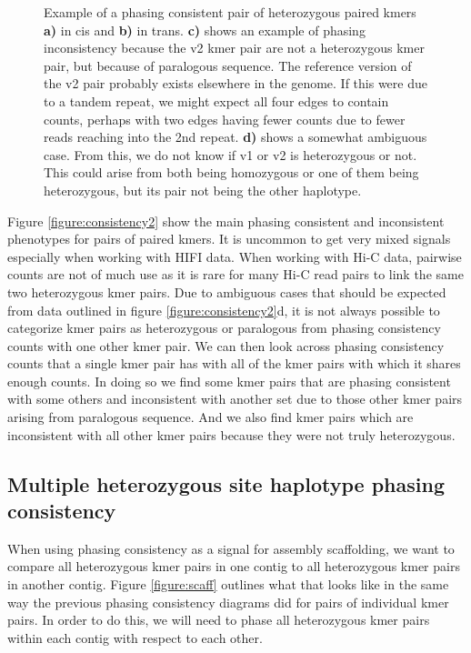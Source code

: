 \begin{figure}[htbp!]
{\begin{tikzpicture}[scale=1]
\end{tikzpicture}\label{fig:d}
}

\par{
Example of a phasing consistent pair of heterozygous paired kmers \textbf{a)} in cis and \textbf{b)} in trans. \textbf{c)} shows an example of phasing inconsistency because the v2 kmer pair are not a heterozygous kmer pair, but because of paralogous sequence. The reference version of the v2 pair probably exists elsewhere in the genome. If this were due to a tandem repeat, we might expect all four edges to contain counts, perhaps with two edges having fewer counts due to fewer reads reaching into the 2nd repeat. \textbf{d)} shows a somewhat ambiguous case. From this, we do not know if v1 or v2 is heterozygous or not. This could arise from both being homozygous or one of them being heterozygous, but its pair not being the other haplotype.
}
\end{figure}

\par{
Figure \ref{figure:consistency2} show the main phasing consistent and inconsistent phenotypes for pairs of paired kmers. It is uncommon to get very mixed signals especially when working with HIFI data. When working with Hi-C data, pairwise counts are not of much use as it is rare for many Hi-C read pairs to link the same two heterozygous kmer pairs. Due to ambiguous cases that should be expected from data outlined in figure \ref{figure:consistency2}d, it is not always possible to categorize kmer pairs as heterozygous or paralogous from phasing consistency counts with one other kmer pair. We can then look across phasing consistency counts that a single kmer pair has with all of the kmer pairs with which it shares enough counts. In doing so we find some kmer pairs that are phasing consistent with some others and inconsistent with another set due to those other kmer pairs arising from paralogous sequence. And we also find kmer pairs which are inconsistent with all other kmer pairs because they were not truly heterozygous.
}



\subsection{Multiple heterozygous site haplotype phasing consistency}

\par{
When using phasing consistency as a signal for assembly scaffolding, we want to compare all heterozygous kmer pairs in one contig to all heterozygous kmer pairs in another contig. Figure \ref{figure:scaff} outlines what that looks like in the same way the previous phasing consistency diagrams did for pairs of individual kmer pairs. In order to do this, we will need to phase all heterozygous kmer pairs within each contig with respect to each other.
}


